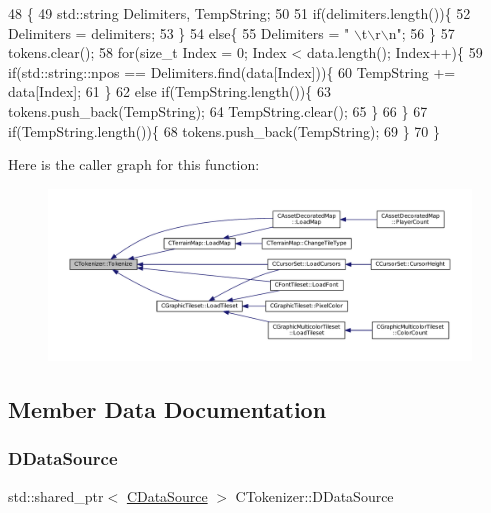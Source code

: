 \begin{DoxyCode}
48                                                                                                           \{
49     std::string Delimiters, TempString;
50     
51     \textcolor{keywordflow}{if}(delimiters.length())\{
52         Delimiters = delimiters;
53     \}
54     \textcolor{keywordflow}{else}\{
55         Delimiters = \textcolor{stringliteral}{" \(\backslash\)t\(\backslash\)r\(\backslash\)n"};
56     \}
57     tokens.clear();
58     \textcolor{keywordflow}{for}(\textcolor{keywordtype}{size\_t} Index = 0; Index < data.length(); Index++)\{
59         \textcolor{keywordflow}{if}(std::string::npos == Delimiters.find(data[Index]))\{
60             TempString += data[Index];
61         \}
62         \textcolor{keywordflow}{else} \textcolor{keywordflow}{if}(TempString.length())\{
63             tokens.push\_back(TempString);
64             TempString.clear();
65         \}
66     \}
67     \textcolor{keywordflow}{if}(TempString.length())\{
68         tokens.push\_back(TempString);
69     \}
70 \}
\end{DoxyCode}
Here is the caller graph for this function\+:
\nopagebreak
\begin{figure}[H]
\begin{center}
\leavevmode
\includegraphics[width=350pt]{classCTokenizer_a7477f6849a3d0a5154879d8622e4012c_icgraph}
\end{center}
\end{figure}


\subsection{Member Data Documentation}
\hypertarget{classCTokenizer_aaa6faab432000d3f942a0c14fc09f60b}{}\label{classCTokenizer_aaa6faab432000d3f942a0c14fc09f60b} 
\subsubsection{\texorpdfstring{D\+Data\+Source}{DDataSource}}
{\footnotesize\ttfamily std\+::shared\+\_\+ptr$<$ \hyperlink{classCDataSource}{C\+Data\+Source} $>$ C\+Tokenizer\+::\+D\+Data\+Source\hspace{0.3cm}{\ttfamily [protected]}}



